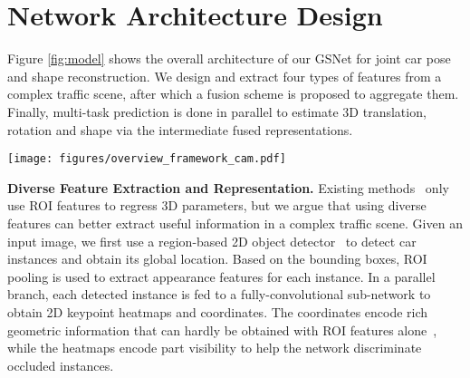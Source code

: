\documentclass[runningheads]{llncs}
\begin{document}
\section{Network Architecture Design}
Figure \ref{fig:model} shows the overall architecture of our GSNet for joint car pose and shape reconstruction. We design and extract four types of features from a complex traffic scene, after which a fusion scheme is proposed to aggregate them. Finally, multi-task prediction is done in parallel to estimate 3D translation, rotation and shape via the intermediate fused representations.

\begin{figure*}[!t]
	\centering
	\texttt{[image: figures/overview\_framework\_cam.pdf]}
	\caption{Overview of our GSNet for joint vehicle pose and shape reconstruction. We use region-based 2D object detector~\cite{he2017mask} and a built-in heatmap regression branch to obtain ROI features, detected boxes, keypoint coordinates (global locations in the whole image) and corresponding heatmap (local positions and visibility in sub-region). GSNet performs an effective fusion of four-way input representations and builds three parallel branches respectively for 3D translation, rotation and shape estimation. 3D shape reconstruction is detailed in Figure~\ref{fig:example2} and our hybrid loss function is illustrated in section~\ref{sec:constraint}.}
	\label{fig:model}
\end{figure*}

\smallskip\noindent\textbf{Diverse Feature Extraction and Representation.}
Existing methods~\cite{kundu20183d,xiang2017posecnn} only use ROI features to regress 3D parameters, but we argue that using diverse features can better extract useful information in a complex traffic scene. Given an input image, we first use a region-based 2D object detector~\cite{he2017mask} to detect car instances and obtain its global location. Based on the bounding boxes, ROI pooling is used to extract appearance features for each instance. In a parallel branch, each detected instance is fed to a fully-convolutional sub-network to obtain 2D keypoint heatmaps and coordinates. The coordinates encode rich geometric information that can hardly be obtained with ROI features alone~\cite{zhao2017simple}, while the heatmaps encode part visibility to help the network discriminate occluded instances. 
\end{document}
